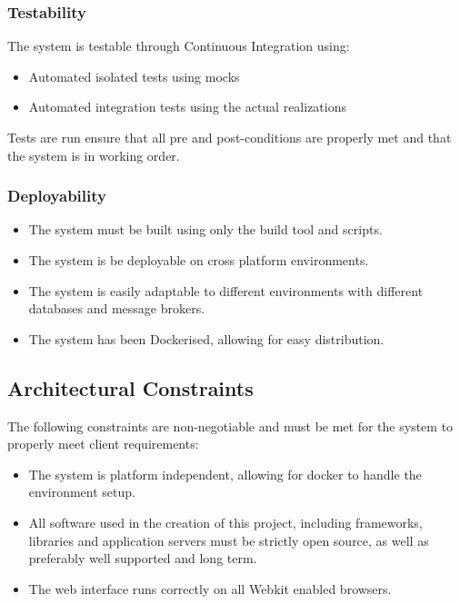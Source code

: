 \documentclass[11pt,a4paper]{article}
\begin{document}
\subsubsection{Testability}
The system is testable through Continuous Integration using:  
\begin{itemize}
	\item Automated isolated tests using mocks
	\item Automated integration tests using the actual realizations 
\end{itemize}
Tests are run ensure that all pre and post-conditions are properly met and that the system is in working order.

\subsubsection{Deployability}
\begin{itemize}
	\item The system must be built using only the build tool and scripts.
	\item The system is be deployable on cross platform environments.
	\item The system is easily adaptable to different environments with different databases and message brokers.
	\item The system has been Dockerised, allowing for easy distribution. 
\end{itemize}

\subsection{Architectural Constraints}
The following constraints are non-negotiable and must be met for the system to properly meet client requirements:
\begin{itemize}
	\item The system is platform independent, allowing for docker to handle the environment setup.
	\item All software used in the creation of this project, including frameworks, libraries and application servers must be strictly open source, as well as preferably well supported and long term.
	\item The web interface runs correctly on all Webkit enabled browsers.
\end{itemize}
\end{document}
